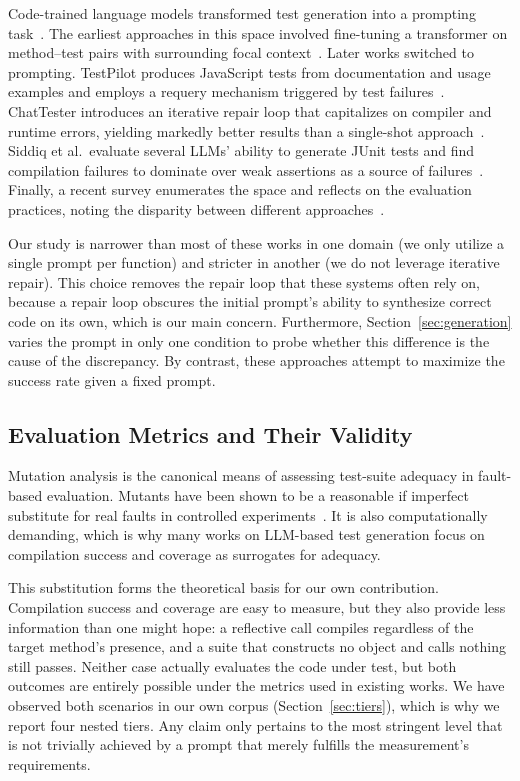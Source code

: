 Code-trained language models transformed test generation into a prompting
task~\cite{chen2021codex}. The earliest approaches in this space involved fine-tuning a
transformer on method--test pairs with surrounding focal context~\cite{tufano2020athenatest}.
Later works switched to prompting. TestPilot produces JavaScript tests from documentation and
usage examples and employs a requery mechanism triggered by test
failures~\cite{schafer2024testpilot}. ChatTester introduces an iterative repair loop that
capitalizes on compiler and runtime errors, yielding markedly better results than a
single-shot approach~\cite{yuan2023chattester}. Siddiq et al.\ evaluate several LLMs' ability
to generate JUnit tests and find compilation failures to dominate over weak assertions as a
source of failures~\cite{siddiq2024junit}. Finally, a recent survey enumerates the space and
reflects on the evaluation practices, noting the disparity between different
approaches~\cite{wang2024llmtesting}.

Our study is narrower than most of these works in one domain (we only utilize a single prompt
per function) and stricter in another (we do not leverage iterative repair). This choice
removes the repair loop that these systems often rely on, because a repair loop obscures the
initial prompt's ability to synthesize correct code on its own, which is our main concern.
Furthermore, Section~\ref{sec:generation} varies the prompt in only one condition to probe
whether this difference is the cause of the discrepancy. By contrast, these approaches attempt
to maximize the success rate given a fixed prompt.

\subsection{Evaluation Metrics and Their Validity}

Mutation analysis is the canonical means of assessing test-suite adequacy in fault-based
evaluation. Mutants have been shown to be a reasonable if imperfect substitute for real faults
in controlled experiments~\cite{just2014mutants,papadakis2019mutation}. It is also
computationally demanding, which is why many works on LLM-based test generation focus on
compilation success and coverage as surrogates for adequacy.

This substitution forms the theoretical basis for our own contribution. Compilation success
and coverage are easy to measure, but they also provide less information than one might hope:
a reflective call compiles regardless of the target method's presence, and a suite that
constructs no object and calls nothing still passes. Neither case actually evaluates the code
under test, but both outcomes are entirely possible under the metrics used in existing works.
We have observed both scenarios in our own corpus (Section~\ref{sec:tiers}), which is why we
report four nested tiers. Any claim only pertains to the most stringent level that is not
trivially achieved by a prompt that merely fulfills the measurement's requirements.

